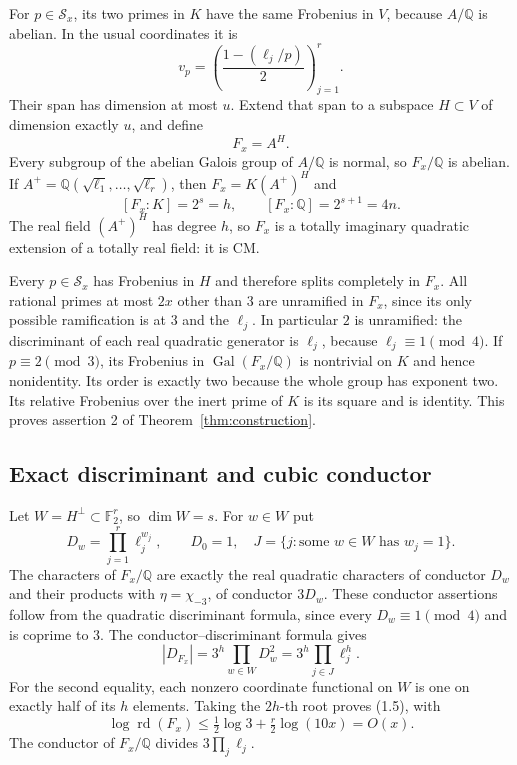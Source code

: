 \documentclass[11pt]{article}
\theoremstyle{remark}\newtheorem{remark}[theorem]{Remark}
\newcommand{\Q}{\mathbb Q}
\newcommand{\F}{\mathbb F}
\newcommand{\Gal}{\operatorname{Gal}}
\newcommand{\rd}{\operatorname{rd}}
\begin{document}
For $p\in\mathcal S_x$, its two primes in $K$ have the same
Frobenius in $V$, because $A/\Q$ is abelian. In the usual
coordinates it is
\[
 v_p=\left(\frac{1-(\ell_j/p)}2\right)_{j=1}^r.
                                                        \tag{4.3}
\]
Their span has dimension at most $u$. Extend that span to a
subspace $H\subset V$ of dimension exactly $u$, and define
\[
                              F_x=A^H.
                                                        \tag{4.4}
\]
Every subgroup of the abelian Galois group of $A/\Q$ is normal,
so $F_x/\Q$ is abelian. If $A^+=\Q(\sqrt{\ell_1},\ldots,
\sqrt{\ell_r})$, then $F_x=K(A^+)^H$ and
\[
 [F_x:K]=2^s=h,\qquad [F_x:\Q]=2^{s+1}=4n.
                                                        \tag{4.5}
\]
The real field $(A^+)^H$ has degree $h$, so $F_x$ is a totally
imaginary quadratic extension of a totally real field: it is CM.

Every $p\in\mathcal S_x$ has Frobenius in $H$ and therefore
splits completely in $F_x$. All rational primes at most $2x$
other than $3$ are unramified in $F_x$, since its only possible
ramification is at $3$ and the $\ell_j$. In particular $2$ is
unramified: the discriminant of each real quadratic generator
is $\ell_j$, because $\ell_j\equiv1\pmod4$.
If $p\equiv2\pmod3$, its Frobenius in $\Gal(F_x/\Q)$ is
nontrivial on $K$ and hence nonidentity. Its order is exactly
two because the whole group has exponent two. Its relative
Frobenius over the inert prime of $K$ is its square and is
identity. This proves assertion 2 of Theorem~\ref{thm:construction}.

\subsection{Exact discriminant and cubic conductor}

Let $W=H^\perp\subset\F_2^r$, so $\dim W=s$. For $w\in W$ put
\[
 D_w=\prod_{j=1}^r\ell_j^{w_j},\qquad D_0=1,
 \quad J=\{j:\text{some }w\in W\text{ has }w_j=1\}.
                                                        \tag{4.6}
\]
The characters of $F_x/\Q$ are exactly the real quadratic
characters of conductor $D_w$ and their products with
$\eta=\chi_{-3}$, of conductor $3D_w$. These conductor assertions
follow from the quadratic discriminant formula, since every
$D_w\equiv1\pmod4$ and is coprime to $3$.
The conductor--discriminant formula
\citep[Chapter V, Theorem~3.27]{Milne2020} gives
\[
 |D_{F_x}|=3^h\prod_{w\in W}D_w^2
           =3^h\prod_{j\in J}\ell_j^h.
                                                        \tag{4.7}
\]
For the second equality, each nonzero coordinate functional on
$W$ is one on exactly half of its $h$ elements. Taking the
$2h$-th root proves (1.5), with
\[
 \log\rd(F_x)\le\tfrac12\log3+\tfrac r2\log(10x)=O(x).
                                                        \tag{4.8}
\]
The conductor of $F_x/\Q$ divides $3\prod_j\ell_j$.
\end{document}
